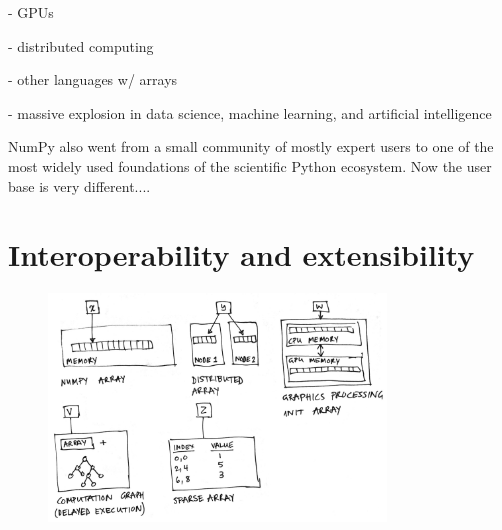 - GPUs

- distributed computing

- other languages w/ arrays

- massive explosion in data science, machine learning, and artificial intelligence

NumPy also went from a small community of mostly expert users to
one of the most widely used foundations of the scientific Python
ecosystem.
Now the user base is very different....

\section*{Interoperability and extensibility}

\begin{figure}
  \centering
  \includegraphics[width=0.8\textwidth]{static/sketches/duck-arrays}
  \caption{}
  \label{fig:duck-arrays}
\end{figure}



